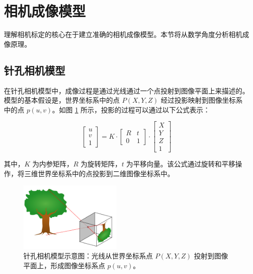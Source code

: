\documentclass[hyperref,a4paper,UTF8]{ctexart}
\begin{document}
\section{相机成像模型}

理解相机标定的核心在于建立准确的相机成像模型。本节将从数学角度分析相机成像原理。

\subsection{针孔相机模型}

在针孔相机模型中，成像过程是通过光线通过一个点投射到图像平面上来描述的。模型的基本假设是，世界坐标系中的点 $P(X, Y, Z)$ 经过投影映射到图像坐标系中的点 $p(u, v)$。如图 \ref{fig:pinhole} 所示，投影的过程可以通过以下公式表示：

\begin{equation}
    \begin{bmatrix}
        u \\ v \\ 1
    \end{bmatrix}
    =
    K \cdot
    \begin{bmatrix}
        R & t \\
        0 & 1
    \end{bmatrix}
    \cdot
    \begin{bmatrix}
        X \\ Y \\ Z \\ 1
    \end{bmatrix}
\end{equation}

其中，$K$ 为内参矩阵，$R$ 为旋转矩阵，$t$ 为平移向量。该公式通过旋转和平移操作，将三维世界坐标系中的点投影到二维图像坐标系中。

\begin{figure}[h]
    \centering
    \includegraphics[width=0.45\textwidth]{assets/pinhole_image.png}
    \caption{针孔相机模型示意图：光线从世界坐标系点 $P(X, Y, Z)$ 投射到图像平面上，形成图像坐标系点 $p(u, v)$。}
    \label{fig:pinhole}
\end{figure}
\end{document}
